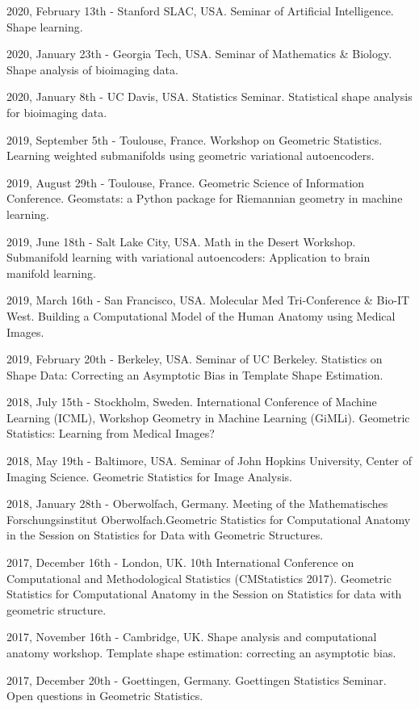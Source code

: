 2020, February 13th - Stanford SLAC, USA. Seminar of Artificial Intelligence. Shape learning.

2020, January 23th - Georgia Tech, USA. Seminar of Mathematics \& Biology. Shape analysis of bioimaging data.

2020, January 8th - UC Davis, USA. Statistics Seminar. Statistical shape analysis for bioimaging data.

2019, September 5th -  Toulouse, France. Workshop on Geometric Statistics. Learning weighted submanifolds using geometric variational autoencoders.

 2019, August 29th -  Toulouse, France. Geometric Science of Information Conference. Geomstats: a Python package for Riemannian geometry in machine learning.

2019, June 18th - Salt Lake City, USA. Math in the Desert Workshop. Submanifold learning with variational autoencoders: Application to brain manifold learning.

2019, March 16th - San Francisco, USA. Molecular Med Tri-Conference \& Bio-IT West. Building a Computational Model of the Human Anatomy using Medical Images.

2019, February 20th - Berkeley, USA. Seminar of UC Berkeley. Statistics on Shape Data: Correcting an Asymptotic Bias in Template Shape Estimation.

2018, July 15th - Stockholm, Sweden. International Conference of Machine Learning (ICML), Workshop Geometry in Machine Learning (GiMLi). Geometric Statistics: Learning from Medical Images?

2018, May 19th - Baltimore, USA. Seminar of John Hopkins University, Center of Imaging Science. Geometric Statistics for Image Analysis.

2018, January 28th - Oberwolfach, Germany. Meeting of the Mathematisches Forschungsinstitut Oberwolfach.Geometric Statistics for Computational Anatomy in the Session on Statistics for Data with Geometric Structures.

2017, December 16th - London, UK. 10th International Conference on Computational and Methodological Statistics (CMStatistics 2017). Geometric Statistics for Computational Anatomy in the Session on Statistics for data with geometric structure.

2017, November 16th - Cambridge, UK. Shape analysis and computational anatomy workshop. Template shape estimation: correcting an asymptotic bias.

2017, December 20th - Goettingen, Germany. Goettingen Statistics Seminar. Open questions in Geometric Statistics.

